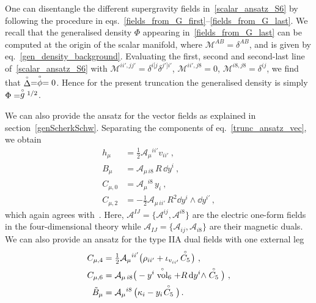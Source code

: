 \documentclass[debug]{phd}
\begin{document}
					One can disentangle the different supergravity fields in~\eqref{scalar_ansatz_S6} by following the procedure in eqs.~\eqref{fields_from_G_first}--\eqref{fields_from_G_last}. 
					We recall that the generalised density $\Phi$ appearing in~\eqref{fields_from_G_last} can be computed at the origin of the scalar manifold, where $\mathcal{M}^{AB}=\delta^{AB}$, and is given by eq.~\eqref{gen_density_background}. 
					Evaluating the first, second and second-last line of~\eqref{scalar_ansatz_S6} with $\mathcal{M}^{ii',jj'}=\delta^{i[j}\delta^{j']i'}$, $\mathcal{M}^{ii',j8}=0$, $\mathcal{M}^{i8,j8}=\delta^{ij}$, we find that $\stackrel{\scriptscriptstyle{\circ}}{\Delta}=\stackrel{\scriptscriptstyle{\circ}}{\phi} = 0$. Hence for the present truncation the generalised density is simply $\Phi = \stackrel{\scriptscriptstyle{\circ}}{g}{}^{1/2}$.

					We can also provide the ansatz for the vector fields as explained in section~\ref{genScherkSchw}. Separating the components of eq.~\eqref{trunc_ansatz_vec}, we obtain
							\begin{align*}
								h_\mu &= \tfrac{1}{2}\mathcal{A}_\mu{}^{ii'} v_{ii'} \ ,\\
								B_{\mu} &= \mathcal{A}_{\mu\,i8} \,R \,\dd y^i\ ,\\
								C_{\mu,0} &= \mathcal{A}_\mu{}^{i8} \,y_i \ ,\\
								C_{\mu,2} &= -\tfrac{1}{2}\mathcal{A}_{\mu\,ii'}\,R^2 \dd y^i \wedge \dd y^{i'} \, ,
							\end{align*}
					which again agrees with~\cite{Guarino:2015vca}. 
					Here, $\mathcal{A}^{IJ} = \{\mathcal{A}^{ij}, \mathcal{A}^{i8} \}$ are the electric one-form fields in the four-dimensional theory while $\mathcal{A}_{IJ} = \{\mathcal{A}_{ij}, \mathcal{A}_{i8} \}$ are their magnetic duals.
					We can also provide an ansatz for the type IIA dual fields with one external leg
							\begin{equation}
								\begin{split}
									C_{\mu ,4} &= \tfrac{1}{2}\mathcal{A}_\mu{}^{ii'} \big(\rho_{ii'} + \iota_{v_{ii'}}\! \stackrel{\scriptscriptstyle{\circ}}{C_5} \!\big)\ ,\\
									C_{\mu ,6} &= \mathcal{A}_{\mu\,i8} \big(-y^i \stackrel{\scriptscriptstyle{\circ}}{\rm vol}_6 + R\, \mathrm{d} y^i\wedge \stackrel{\scriptscriptstyle{\circ}}{C_5}\big) \ ,\\
									\tilde{B}_{\mu} &= \mathcal{A}_\mu{}^{i8} \, \big(\kappa_i -y_i \!\stackrel{\scriptscriptstyle{\circ}}{C_5}\big) \, .
								\end{split}
							\end{equation}
\end{document}
